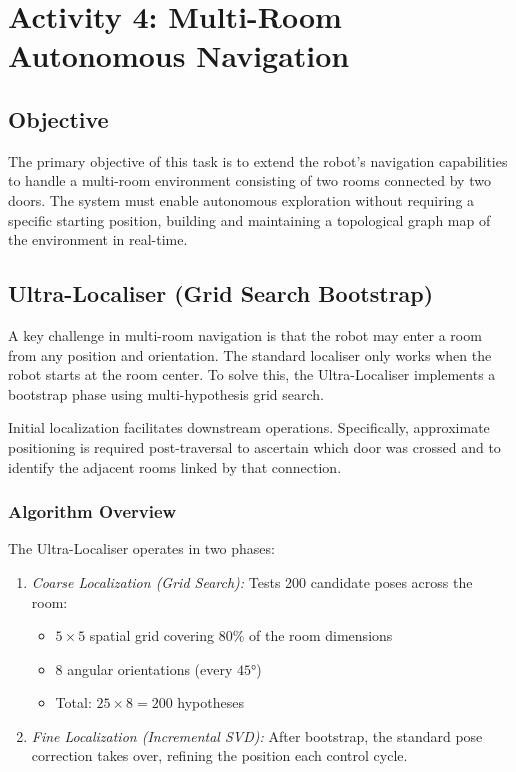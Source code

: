 \documentclass[conference]{IEEEtran}
\begin{document}
    \section{Activity 4: Multi-Room Autonomous Navigation}

    \subsection{Objective}
    The primary objective of this task is to extend the robot's navigation capabilities to handle a multi-room environment consisting of two rooms connected by two doors. The system must enable autonomous exploration without requiring a specific starting position, building and maintaining a topological graph map of the environment in real-time.

    \subsection{Ultra-Localiser (Grid Search Bootstrap)}
    A key challenge in multi-room navigation is that the robot may enter a room from any position and orientation. The standard localiser only works when the robot starts at the room center. To solve this, the Ultra-Localiser implements a bootstrap phase using multi-hypothesis grid search.

    \vspace{0.1cm}

    Initial localization facilitates downstream operations. Specifically, approximate positioning is required post-traversal to ascertain which door was crossed and to identify the adjacent rooms linked by that connection.

    \vspace{0.1cm}

    \subsubsection{\textbf{Algorithm Overview}}
    The Ultra-Localiser operates in two phases:
    \begin{enumerate}[label=\alph*)]
        \item \textit{Coarse Localization (Grid Search):} Tests 200 candidate poses across the room:
        \begin{itemize}
            \item $5 \times 5$ spatial grid covering 80\% of the room dimensions
            \item 8 angular orientations (every $45°$)
            \item Total: $25 \times 8 = 200$ hypotheses
        \end{itemize}
        \item \textit{Fine Localization (Incremental SVD):} After bootstrap, the standard pose correction takes over, refining the position each control cycle.
    \end{enumerate}
\end{document}

